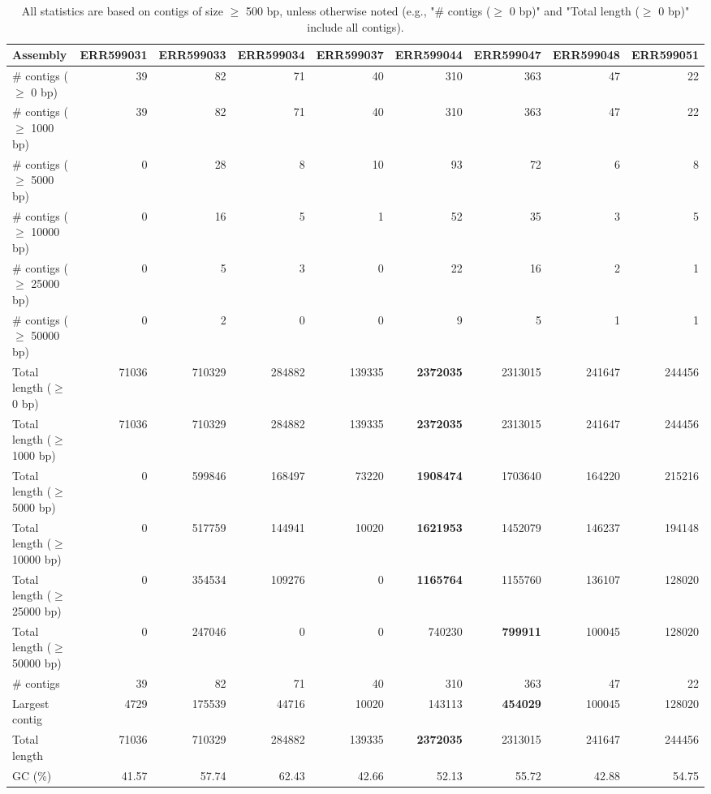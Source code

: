 \documentclass[12pt,a4paper]{article}
\begin{document}
\begin{table}[ht]
\begin{center}
\caption{All statistics are based on contigs of size $\geq$ 500 bp, unless otherwise noted (e.g., "\# contigs ($\geq$ 0 bp)" and "Total length ($\geq$ 0 bp)" include all contigs).}
\begin{tabular}{|l*{8}{|r}|}
\hline
Assembly & ERR599031 & ERR599033 & ERR599034 & ERR599037 & ERR599044 & ERR599047 & ERR599048 & ERR599051 \\ \hline
\# contigs ($\geq$ 0 bp) & 39 & 82 & 71 & 40 & 310 & 363 & 47 & 22 \\ \hline
\# contigs ($\geq$ 1000 bp) & 39 & 82 & 71 & 40 & 310 & 363 & 47 & 22 \\ \hline
\# contigs ($\geq$ 5000 bp) & 0 & 28 & 8 & 10 & 93 & 72 & 6 & 8 \\ \hline
\# contigs ($\geq$ 10000 bp) & 0 & 16 & 5 & 1 & 52 & 35 & 3 & 5 \\ \hline
\# contigs ($\geq$ 25000 bp) & 0 & 5 & 3 & 0 & 22 & 16 & 2 & 1 \\ \hline
\# contigs ($\geq$ 50000 bp) & 0 & 2 & 0 & 0 & 9 & 5 & 1 & 1 \\ \hline
Total length ($\geq$ 0 bp) & 71036 & 710329 & 284882 & 139335 & {\bf 2372035} & 2313015 & 241647 & 244456 \\ \hline
Total length ($\geq$ 1000 bp) & 71036 & 710329 & 284882 & 139335 & {\bf 2372035} & 2313015 & 241647 & 244456 \\ \hline
Total length ($\geq$ 5000 bp) & 0 & 599846 & 168497 & 73220 & {\bf 1908474} & 1703640 & 164220 & 215216 \\ \hline
Total length ($\geq$ 10000 bp) & 0 & 517759 & 144941 & 10020 & {\bf 1621953} & 1452079 & 146237 & 194148 \\ \hline
Total length ($\geq$ 25000 bp) & 0 & 354534 & 109276 & 0 & {\bf 1165764} & 1155760 & 136107 & 128020 \\ \hline
Total length ($\geq$ 50000 bp) & 0 & 247046 & 0 & 0 & 740230 & {\bf 799911} & 100045 & 128020 \\ \hline
\# contigs & 39 & 82 & 71 & 40 & 310 & 363 & 47 & 22 \\ \hline
Largest contig & 4729 & 175539 & 44716 & 10020 & 143113 & {\bf 454029} & 100045 & 128020 \\ \hline
Total length & 71036 & 710329 & 284882 & 139335 & {\bf 2372035} & 2313015 & 241647 & 244456 \\ \hline
GC (\%) & 41.57 & 57.74 & 62.43 & 42.66 & 52.13 & 55.72 & 42.88 & 54.75 \\ \hline

\end{tabular}
\end{center}
\end{table}
\end{document}
